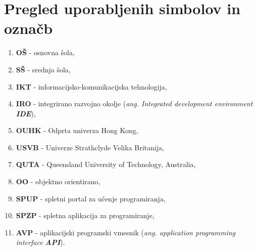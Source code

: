 
\section*{Pregled uporabljenih simbolov in označb}
\label{sec:pregled_uporabljenih_simbolov_in_označb}

\begin{enumerate}[leftmargin=*]
\item \textbf{OŠ} - osnovna šola,
\item \textbf{SŠ} - srednja šola,
\item \textbf{IKT} - informacijsko-komunikacijska tehnologija,
\item \textbf{IRO} - integrirano razvojno okolje (\emph{ang. Integrated
    development environment \textbf{IDE}}),
\item \textbf{OUHK} - Odprta univerza Hong Kong,
  
\item \textbf{USVB} - Univerze Strathclyde Velika Britanija,
\item \textbf{QUTA} - Queensland University of Technology, Australia,
\item \textbf{OO} - objektno orientirano,
  
\item \textbf{SPUP} - spletni portal za učenje programiranja,
\item \textbf{SPZP} - spletna aplikacija za programiranje,
\item \textbf{AVP} - aplikacijski programski vmesnik
  (\emph{ang. application programming interface \textbf{API}}).

  
\end{enumerate}




